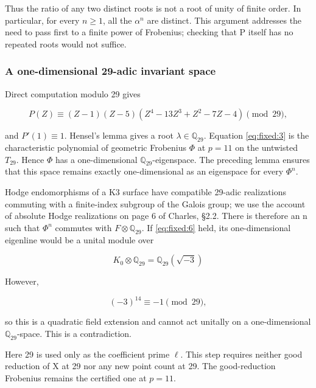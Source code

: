 \documentclass[11pt,a4paper,oneside]{article}
\theoremstyle{plain}
\theoremstyle{definition}
\theoremstyle{remark}
\numberwithin{equation}{section}
\begin{document}
Thus the ratio of any two distinct roots is not a root of unity of finite order. In particular, for every \(n\ge1\), all the \(\alpha^n\) are distinct. This argument addresses the need to pass first to a finite power of Frobenius; checking that P itself has no repeated roots would not suffice.

\subsubsection{A one-dimensional 29-adic invariant space}\label{sec:fixed:29}

Direct computation modulo 29 gives

\begin{equation}
P(Z)\equiv(Z-1)(Z-5)(Z^4-13Z^3+Z^2-7Z-4)\pmod {29},            \label{eq:fixed:7}
\end{equation}

and \(P'(1)\equiv1\). Hensel's lemma gives a root \(\lambda\in\mathbb Q_{29}\). Equation \eqref{eq:fixed:3} is the characteristic polynomial of geometric Frobenius \(\Phi\) at \(p=11\) on the untwisted \(T_{29}\). Hence \(\Phi\) has a one-dimensional \(\mathbb Q_{29}\)-eigenspace. The preceding lemma ensures that this space remains exactly one-dimensional as an eigenspace for every \(\Phi^n\).

Hodge endomorphisms of a K3 surface have compatible 29-adic realizations commuting with a finite-index subgroup of the Galois group; we use the account of absolute Hodge realizations on page 6 of Charles, §2.2. There is therefore an n such that \(\Phi^n\) commutes with \(F\otimes\mathbb Q_{29}\). If \eqref{eq:fixed:6} held, its one-dimensional eigenline would be a unital module over

\begin{equation}
K_0\otimes\mathbb Q_{29}=\mathbb Q_{29}(\sqrt{-3})
\end{equation}

However,

\begin{equation}
(-3)^{14}\equiv-1\pmod {29},
\end{equation}

so this is a quadratic field extension and cannot act unitally on a one-dimensional \(\mathbb Q_{29}\)-space. This is a contradiction.

Here 29 is used only as the coefficient prime \(\ell\). This step requires neither good reduction of X at 29 nor any new point count at 29. The good-reduction Frobenius remains the certified one at \(p=11\).
\end{document}
